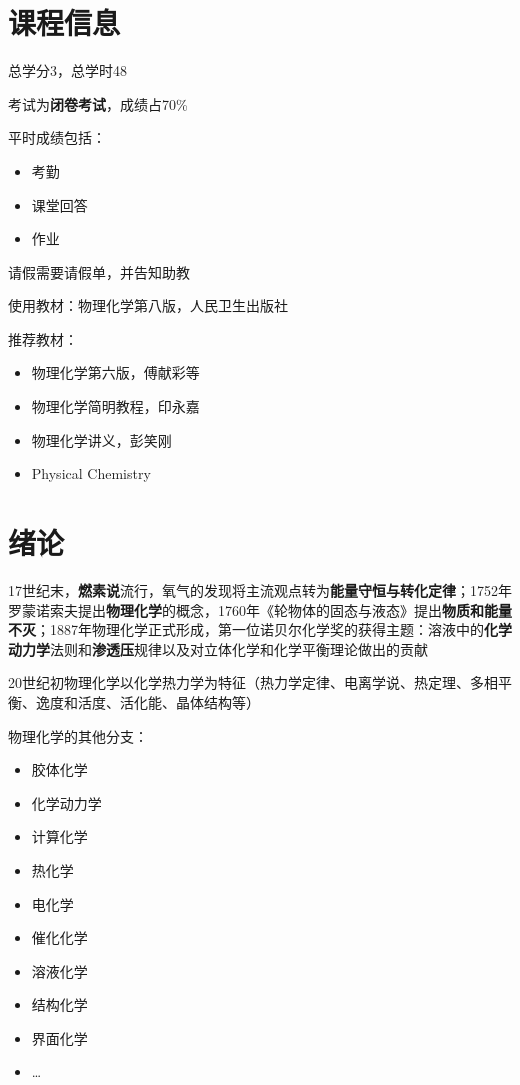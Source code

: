 \section{课程信息}%
\label{sec:课程信息}
总学分3，总学时48

考试为\textbf{闭卷考试}，成绩占70\%

平时成绩包括：
\begin{itemize}
    \item 考勤
    \item 课堂回答
    \item 作业
\end{itemize}
请假需要请假单，并告知助教

使用教材：物理化学第八版，人民卫生出版社

推荐教材：
\begin{itemize}
    \item 物理化学第六版，傅献彩等
    \item 物理化学简明教程，印永嘉
    \item 物理化学讲义，彭笑刚
    \item Physical Chemistry
\end{itemize}
\section{绪论}%
\label{sec:绪论}
17世纪末，\textbf{燃素说}流行，氧气的发现将主流观点转为\textbf{能量守恒与转化定律}；1752年罗蒙诺索夫提出\textbf{物理化学}的概念，1760年《轮物体的固态与液态》提出\textbf{物质和能量不灭}；1887年物理化学正式形成，第一位诺贝尔化学奖的获得主题：溶液中的\textbf{化学动力学}法则和\textbf{渗透压}规律以及对立体化学和化学平衡理论做出的贡献

20世纪初物理化学以化学热力学为特征（热力学定律、电离学说、热定理、多相平衡、逸度和活度、活化能、晶体结构等）

物理化学的其他分支：
\begin{itemize}
    \item 胶体化学
    \item 化学动力学
    \item 计算化学
    \item 热化学
    \item 电化学
    \item 催化化学
    \item 溶液化学
    \item 结构化学
    \item 界面化学
    \item \ldots 
    
\end{itemize}
